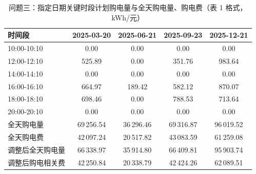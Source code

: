 \begin{table}[htbp]
\centering
\caption{问题三\nobreak：指定日期关键时段计划购电量与全天购电量\nobreak、购电费（表 1 格式\nobreak，kWh/元\nobreak）}
\label{tab:q3t1}
\begin{tabular}{@{}lcccc@{}}
\toprule
时间段 & 2025-03-20 & 2025-06-21 & 2025-09-23 & 2025-12-21 \\
\midrule
10:00-10:10 & 0.00 & 0.00 & 0.00 & 0.00 \\
12:00-12:10 & 525.89 & 0.00 & 351.76 & 983.64 \\
14:00-14:10 & 0.00 & 0.00 & 0.00 & 0.00 \\
16:00-16:10 & 664.97 & 189.42 & 582.12 & 870.07 \\
18:00-18:10 & 698.46 & 0.00 & 788.53 & 713.64 \\
20:00-20:10 & 0.00 & 0.00 & 0.00 & 0.00 \\
\midrule
全天购电量 & 69\,256.54 & 36\,296.46 & 69\,316.87 & 96\,019.52 \\
全天购电费 & 42\,097.24 & 20\,517.82 & 43\,083.59 & 61\,259.08 \\
调整后全天购电量 & 66\,338.97 & 35\,914.80 & 66\,409.81 & 95\,903.74 \\
调整后购电相关费 & 42\,250.84 & 20\,338.79 & 42\,424.26 & 62\,089.51 \\
\bottomrule
\end{tabular}
\end{table}

